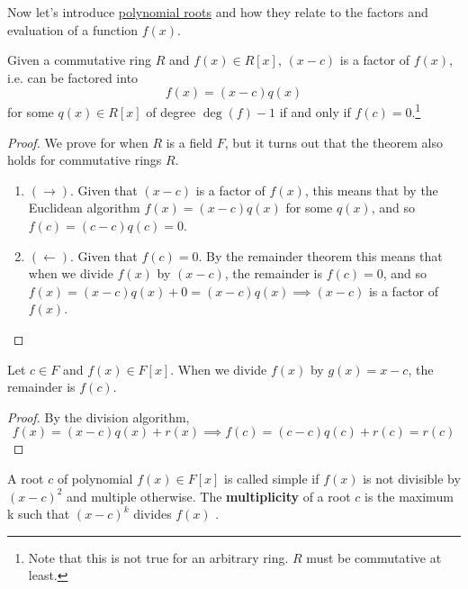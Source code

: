   Now let's introduce \hyperref[def:polynomial-root]{polynomial roots} and how they relate to the factors and evaluation of a function $f(x)$. 

  \begin{corollary}
    \label{thm:root-factor-theorem}
    Given a commutative ring $R$ and $f(x) \in R[x]$, $(x - c)$ is a factor of $f(x)$, i.e. can be factored into 
    \begin{equation}
      f(x) = (x - c) q(x) 
    \end{equation}
    for some $q(x) \in R[x]$ of degree $\deg(f) - 1$ if and only if $f(c) = 0$.\footnote{Note that this is not true for an arbitrary ring. $R$ must be commutative at least.}
  \end{corollary} 
  \begin{proof}
    We prove for when $R$ is a field $F$, but it turns out that the theorem also holds for commutative rings $R$. 
    \begin{enumerate}
      \item $(\rightarrow)$. Given that $(x - c)$ is a factor of $f(x)$, this means that by the Euclidean algorithm $f(x) = (x - c) q(x)$ for some $q(x)$, and so $f(c) = (c - c) q(c) = 0$. 
      \item $(\leftarrow)$. Given that $f(c) = 0$. By the remainder theorem this means that when we divide $f(x)$ by $(x - c)$, the remainder is $f(c) = 0$, and so $f(x) = (x - c) q(x) + 0 = (x - c) q(x) \implies (x - c)$ is a factor of $f(x)$. 
    \end{enumerate}
  \end{proof}

  \begin{corollary}
    \label{thm:remainder-theorem}
    Let $c \in F$ and $f(x) \in F[x]$. When we divide $f(x)$ by $g(x) = x - c$, the remainder is $f(c)$. 
  \end{corollary}
  \begin{proof}
    By the division algorithm, 
    \begin{equation}
      f(x) = (x - c) q(x) + r(x) \implies f(c) = (c - c) q(c) + r(c) = r(c)
    \end{equation}
  \end{proof} 

  \begin{definition}[Multiplicity]
    \label{def:multiplicity}
    A root $c$ of polynomial $f(x) \in F[x]$ is called simple if $f(x)$ is not divisible by $(x - c)^2$ and multiple otherwise. The \textbf{multiplicity} of a root $c$ is the maximum k such that $(x - c)^k$ divides $f(x)$ .
  \end{definition} 


